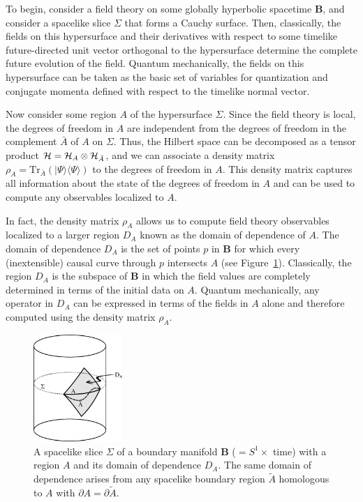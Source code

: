 \documentclass[12pt]{article}
\renewcommand{\(}{\left(}
\renewcommand{\)}{\right)}
\newcommand{\tr}{\mathrm{Tr}}
\begin{document}
To begin, consider a field theory on some globally hyperbolic spacetime {\bf B}, and consider a spacelike slice $\Sigma$ that forms a Cauchy surface. Then, classically, the fields on this hypersurface and their derivatives with respect to some timelike future-directed unit vector orthogonal to the hypersurface determine the complete future evolution of the field. Quantum mechanically, the fields on this hypersurface can be taken as the basic set of variables for quantization and conjugate momenta defined with respect to the timelike normal vector.

Now consider some region $A$ of the hypersurface $\Sigma$. Since the field theory is local, the degrees of freedom in $A$ are independent from the degrees of freedom in the complement $\bar{A}$ of $A$ on $\Sigma$. Thus, the Hilbert space can be decomposed as a tensor product ${\cal H} = {\cal H}_A \otimes {\cal H}_{\bar{A}}$, and we can associate a density matrix
$\rho_A = \tr_{\bar{A}}(|\Psi \rangle \langle \Psi \rangle)$ to the degrees of freedom in $A$. This density matrix captures all information about the state of the degrees of freedom in $A$ and can be used to compute any observables localized to $A$.

In fact, the density matrix $\rho_A$ allows us to compute field theory observables localized to a larger region $D_A$ known as the domain of dependence of $A$. The domain of dependence $D_A$ is the set of points $p$ in {\bf B} for which every (inextensible) causal curve through $p$ intersects $A$ (see Figure~\ref{domaind}). Classically, the region $D_A$ is the subspace of {\bf B} in which the field values are completely determined in terms of the initial data on $A$. Quantum mechanically, any operator in $D_A$ can be expressed in terms of the fields in $A$ alone and therefore computed using the density matrix $\rho_A$.

\begin{figure}
\centering
\includegraphics[width=0.3\textwidth]{definitions-jk.eps}
\caption{A spacelike slice $\Sigma$ of a boundary manifold {\bf B} ($ = S^1 \times$ time) with a region $A$ and its domain of dependence $D_A$. The same domain of dependence arises from any spacelike boundary region $\tilde{A}$ homologous to $A$ with $\partial A = \partial \tilde{A}$.}
\label{domaind}
\end{figure}
\end{document}
